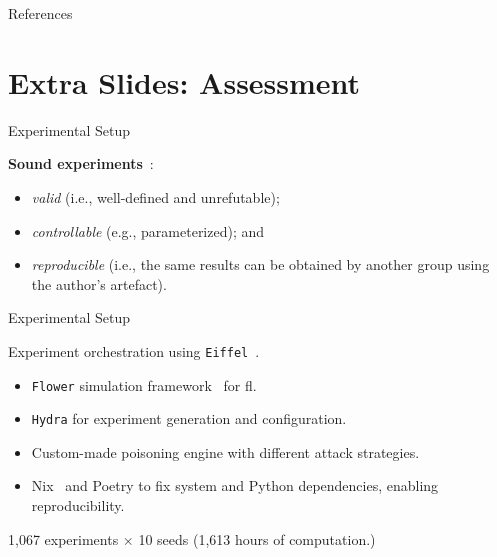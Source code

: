
\appendix

\begin{frame}[allowframebreaks]{References}
  \printbibliography[heading=none]
\end{frame}

\section*{Extra Slides: Assessment}

\begin{frame}
  \sectionpage
\end{frame}

\begin{frame}{Experimental Setup}

  \textbf{Sound experiments}~\cite{uetz_ReproducibleAdaptableLog_2021,ACM_artifacts}:
  \begin{itemize}
    \item \emph{valid} (i.e., well-defined and unrefutable);
    \item \emph{controllable} (e.g., parameterized); and
    \item \emph{reproducible} (i.e., the same results can be obtained by another group using the author’s artefact).
  \end{itemize}

\end{frame}

\begin{frame}{Experimental Setup}
    
  Experiment orchestration using \texttt{Eiffel}~\cite{lavaur_icdcs_demo_2024}.
  \begin{itemize}
      \item \texttt{Flower} simulation framework~\cite{beutel_Flowerfriendlyfederated_2020} for \gls{fl}.
      \item \texttt{Hydra} for experiment generation and configuration.
      \item Custom-made poisoning engine with different attack strategies.
      \item Nix~\cite{dolstra_purelyfunctionalsoftware_2006} and Poetry to fix system and Python dependencies, enabling reproducibility.
  \end{itemize}

  1,067 experiments $\times$ 10 seeds (1,613 hours of computation.)
\end{frame}


